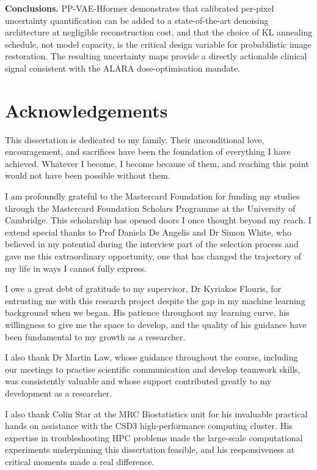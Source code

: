 \documentclass[12pt, a4paper, twoside, openright]{book}
\begin{document}
\textbf{Conclusions.}
PP-VAE-Hformer demonstrates that calibrated per-pixel uncertainty quantification can be added to a state-of-the-art denoising architecture at negligible reconstruction cost, and that the choice of KL annealing schedule, not model capacity, is the critical design variable for probabilistic image restoration. The resulting uncertainty maps provide a directly actionable clinical signal consistent with the ALARA dose-optimisation mandate.

\newpage

\chapter*{Acknowledgements}

This dissertation is dedicated to my family. Their unconditional love, encouragement, and sacrifices have been the foundation of everything I have achieved. Whatever I become, I become because of them, and reaching this point would not have been possible without them.

I am profoundly grateful to the Mastercard Foundation for funding my studies through the Mastercard Foundation Scholars Programme at the University of Cambridge. This scholarship has opened doors I once thought beyond my reach. I extend special thanks to Prof Daniela De Angelis and  Dr Simon White, who believed in my potential during the interview part of the selection process and gave me this extraordinary opportunity, one that has changed the trajectory of my life in ways I cannot fully express.

I owe a great debt of gratitude to my supervisor, Dr Kyriakos Flouris, for entrusting me with this research project despite the gap in my machine learning background when we began. His patience throughout my learning curve, his willingness to give me the space to develop, and the quality of his guidance have been fundamental to my growth as a researcher.

I also thank Dr Martin Law, whose guidance throughout the course, including our meetings to practise scientific communication and develop teamwork skills, was consistently valuable and whose support contributed greatly to my development as a researcher.

I also thank Colin Star at the MRC Biostatistics unit for his invaluable practical hands on assistance with the CSD3 high-performance computing cluster. His expertise in troubleshooting HPC problems made the large-scale computational experiments underpinning this dissertation feasible, and his responsiveness at critical moments made a real difference.
\end{document}
